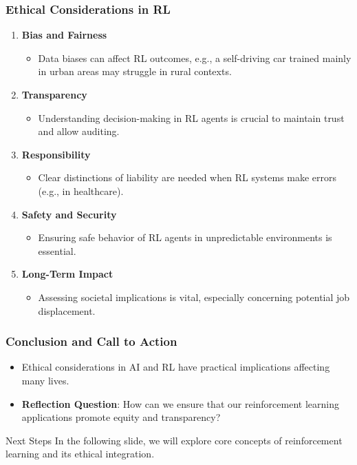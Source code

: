 \documentclass[aspectratio=169]{beamer}
\begin{document}
\begin{frame}[fragile]
    \frametitle{Ethical Considerations in RL}
    \begin{enumerate}
        \item \textbf{Bias and Fairness}
            \begin{itemize}
                \item Data biases can affect RL outcomes, e.g., a self-driving car trained mainly in urban areas may struggle in rural contexts.
            \end{itemize}
        \item \textbf{Transparency}
            \begin{itemize}
                \item Understanding decision-making in RL agents is crucial to maintain trust and allow auditing.
            \end{itemize}
        \item \textbf{Responsibility}
            \begin{itemize}
                \item Clear distinctions of liability are needed when RL systems make errors (e.g., in healthcare).
            \end{itemize}
        \item \textbf{Safety and Security}
            \begin{itemize}
                \item Ensuring safe behavior of RL agents in unpredictable environments is essential.
            \end{itemize}
        \item \textbf{Long-Term Impact}
            \begin{itemize}
                \item Assessing societal implications is vital, especially concerning potential job displacement.
            \end{itemize}
    \end{enumerate}
\end{frame}

\begin{frame}[fragile]
    \frametitle{Conclusion and Call to Action}
    \begin{itemize}
        \item Ethical considerations in AI and RL have practical implications affecting many lives.
        \item \textbf{Reflection Question}: How can we ensure that our reinforcement learning applications promote equity and transparency?
    \end{itemize}
    \begin{block}{Next Steps}
        In the following slide, we will explore core concepts of reinforcement learning and its ethical integration.
    \end{block}
\end{frame}
\end{document}
